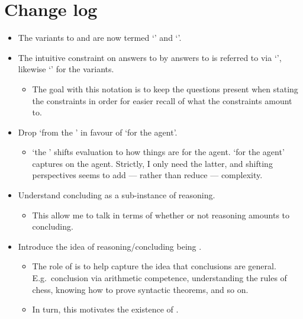 \chapter*{Change log}
\label{cha:changes}


\begin{itemize}
\item
  The variants to \qWhy{} and \qHow{} are now termed `\qWhyV{}' and `\qHowV{}'.
\item
  The intuitive constraint on answers to \qWhy{} by answers to \qHow{} is referred to via `\issueInclusion{}', likewise `\issueConstraint{}' for the variants.
  \begin{itemize}
  \item
    The goal with this notation is to keep the questions present when stating the constraints in order for easier recall of what the constraints amount to.
  \end{itemize}
\item
  Drop `from the \agpe{}' in favour of `for the agent'.
  \begin{itemize}
  \item
    `the \agpe{}' shifts evaluation to how things are for the agent.
    `for the agent' captures  on the agent.
    Strictly, I only need the latter, and shifting perspectives seems to add --- rather than reduce --- complexity.
  \end{itemize}
\item
  Understand concluding as a sub-instance of reasoning.
  \begin{itemize}
  \item
    This allow me to talk in terms of whether or not reasoning amounts to concluding.
  \end{itemize}
\item
  Introduce the idea of reasoning/concluding being \sR{}.
  \begin{itemize}
  \item
    The role of \sR{} is to help capture the idea that conclusions are general.
    E.g.\ conclusion via arithmetic competence, understanding the rules of chess, knowing how to prove syntactic theorems, and so on.
  \item
    In turn, this motivates the existence of .
  \end{itemize}
\end{itemize}

